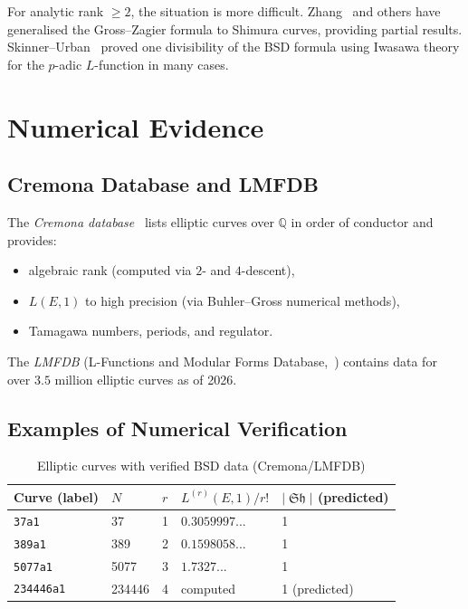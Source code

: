 \documentclass[12pt,a4paper]{article}
\theoremstyle{remark}
\DeclareMathOperator{\Sha}{\mathfrak{Sh}}
\begin{document}
For analytic rank $\geq 2$, the situation is more difficult.  Zhang~\cite{Zhang2001}
and others have generalised the Gross--Zagier formula to Shimura curves, providing
partial results.  Skinner--Urban~\cite{SkinnerUrban2014} proved one divisibility of the
BSD formula using Iwasawa theory for the $p$-adic $L$-function in many cases.

\section{Numerical Evidence}

\subsection{Cremona Database and LMFDB}

The \emph{Cremona database}~\cite{Cremona2023} lists elliptic curves over $\mathbb{Q}$
in order of conductor and provides:
\begin{itemize}[nosep]
  \item algebraic rank (computed via $2$- and $4$-descent),
  \item $L(E,1)$ to high precision (via Buhler--Gross numerical methods),
  \item Tamagawa numbers, periods, and regulator.
\end{itemize}

The \emph{LMFDB} (L-Functions and Modular Forms Database,~\cite{LMFDB}) contains
data for over $3.5$ million elliptic curves as of 2026.

\subsection{Examples of Numerical Verification}

\begin{table}[h]
\centering
\begin{tabular}{lllll}
\toprule
Curve (label) & $N$ & $r$ & $L^{(r)}(E,1)/r!$ & $|\Sha|$ (predicted) \\
\midrule
\texttt{37a1} & 37  & 1 & $0.3059997...$ & 1 \\
\texttt{389a1} & 389 & 2 & $0.1598058...$ & 1 \\
\texttt{5077a1} & 5077 & 3 & $1.7327...$ & 1 \\
\texttt{234446a1} & 234446 & 4 & computed & 1 (predicted) \\
\bottomrule
\end{tabular}
\caption{Elliptic curves with verified BSD data (Cremona/LMFDB)}
\end{table}
\end{document}
